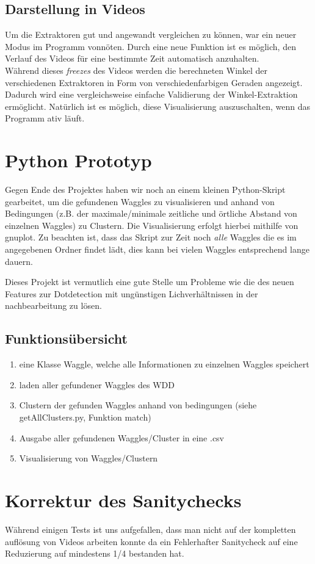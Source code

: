 \documentclass[11pt,a4paper]{article}
\begin{document}
\subsection{Darstellung in Videos}%

Um die Extraktoren gut und angewandt vergleichen zu können, war ein neuer Modus im Programm vonnöten. Durch eine neue Funktion ist es möglich, den Verlauf des Videos für eine bestimmte Zeit automatisch anzuhalten.\\
Während dieses \textit{freezes} des Videos werden die berechneten Winkel der verschiedenen Extraktoren in Form von verschiedenfarbigen Geraden angezeigt.
Dadurch wird eine vergleichsweise einfache Validierung der Winkel-Extraktion ermöglicht. Natürlich ist es möglich, diese Visualisierung auszuschalten, wenn das Programm ativ läuft.

\section{Python Prototyp}%
Gegen Ende des Projektes haben wir noch an einem kleinen Python-Skript gearbeitet, um die gefundenen Waggles zu visualisieren und anhand von Bedingungen (z.B. der maximale/minimale zeitliche und örtliche Abstand von einzelnen Waggles) zu Clustern. Die Visualisierung erfolgt hierbei mithilfe von gnuplot. Zu beachten ist, dass das Skript zur Zeit noch \emph{alle} Waggles die es im angegebenen Ordner findet lädt, dies kann bei vielen Waggles entsprechend lange dauern.

Dieses Projekt ist vermutlich eine gute Stelle um Probleme wie die des neuen Features zur Dotdetection mit ungünstigen Lichverhältnissen in der nachbearbeitung zu lösen.
\subsection{Funktionsübersicht}%
\begin{enumerate}
\item eine Klasse Waggle, welche alle Informationen zu einzelnen Waggles speichert
\item laden aller gefundener Waggles des WDD
\item Clustern der gefunden Waggles anhand von bedingungen (siehe getAllClusters.py, Funktion match)
\item Ausgabe aller gefundenen Waggles/Cluster in eine .csv
\item Visualisierung von Waggles/Clustern\\
\end{enumerate}

\section{Korrektur des Sanitychecks}
Während einigen Tests ist uns aufgefallen, dass man nicht auf der kompletten auflösung von Videos arbeiten konnte da ein Fehlerhafter Sanitycheck auf eine Reduzierung auf mindestens 1/4 bestanden hat.
\end{document}
